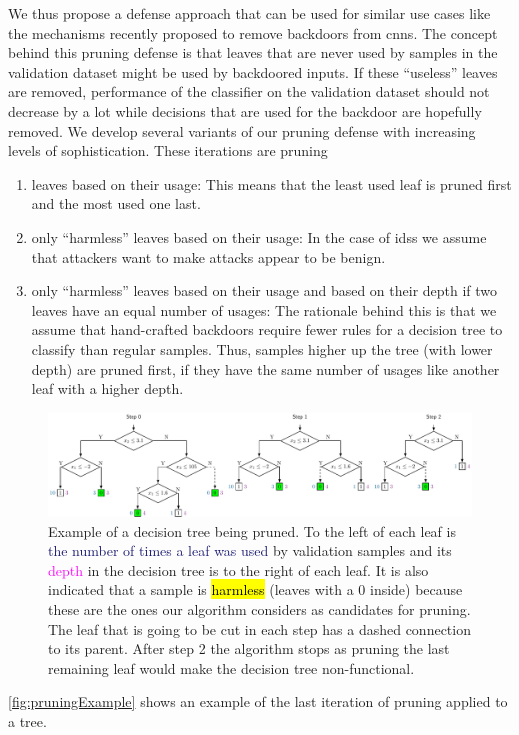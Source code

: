 \documentclass[10pt,sigconf,letterpaper,dvipsnames]{acmart}
\begin{document}
We thus propose a defense approach that can be used for similar use cases like the mechanisms recently proposed to remove backdoors from \glspl{cnn}. The concept behind this pruning defense is that leaves that are never used by samples in the validation dataset might be used by backdoored inputs. If these ``useless'' leaves are removed, performance of the classifier on the validation dataset should not decrease by a lot while decisions that are used for the backdoor are hopefully removed. We develop several variants of our pruning defense with increasing levels of sophistication. These iterations are pruning
\begin{enumerate}
\item leaves based on their usage: This means that the least used leaf is pruned first and the most used one last. 
\item only ``harmless'' leaves based on their usage: In the case of \glspl{ids} we assume that attackers want to make attacks appear to be benign. 
\item only ``harmless'' leaves based on their usage and based on their depth if two leaves have an equal number of usages: The rationale behind this is that we assume that hand-crafted backdoors require fewer rules for a decision tree to classify than regular samples. Thus, samples higher up the tree (with lower depth) are pruned first, if they have the same number of usages like another leaf with a higher depth. 
\end{enumerate}
\begin{figure}[h]
\includegraphics[width=\textwidth]{pruning_example.pdf}
\caption{Example of a decision tree being pruned. To the left of each leaf is \textcolor{MidnightBlue}{the number of times a leaf was used} by validation samples and its \textcolor{Fuchsia}{depth} in the decision tree is to the right of each leaf. It is also indicated that a sample is \protect{} \hl{harmless} (leaves with a 0 inside) because these are the ones our algorithm considers as candidates for pruning. The leaf that is going to be cut in each step has a dashed connection to its parent. After step 2 the algorithm stops as pruning the last remaining leaf would make the decision tree non-functional.}
\label{fig:pruningExample}
\end{figure}
\autoref{fig:pruningExample} shows an example of the last iteration of pruning applied to a tree.
\end{document}
